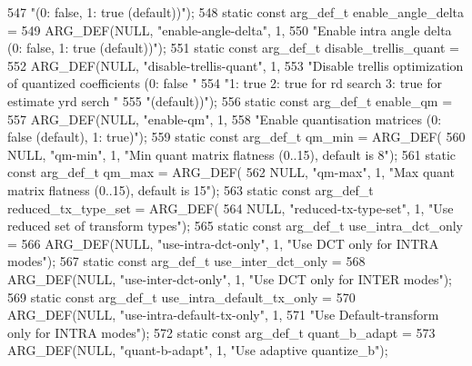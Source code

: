 \begin{DoxyCodeInclude}
{{{{{{{547             \textcolor{stringliteral}{"(0: false, 1: true (default))"});
548 \textcolor{keyword}{static} \textcolor{keyword}{const} arg\_def\_t enable\_angle\_delta =
549     ARG\_DEF(NULL, \textcolor{stringliteral}{"enable-angle-delta"}, 1,
550             \textcolor{stringliteral}{"Enable intra angle delta (0: false, 1: true (default))"});
551 \textcolor{keyword}{static} \textcolor{keyword}{const} arg\_def\_t disable\_trellis\_quant =
552     ARG\_DEF(NULL, \textcolor{stringliteral}{"disable-trellis-quant"}, 1,
553             \textcolor{stringliteral}{"Disable trellis optimization of quantized coefficients (0: false "}
554             \textcolor{stringliteral}{"1: true  2: true for rd search 3: true for estimate yrd serch "}
555             \textcolor{stringliteral}{"(default))"});
556 \textcolor{keyword}{static} \textcolor{keyword}{const} arg\_def\_t enable\_qm =
557     ARG\_DEF(NULL, \textcolor{stringliteral}{"enable-qm"}, 1,
558             \textcolor{stringliteral}{"Enable quantisation matrices (0: false (default), 1: true)"});
559 \textcolor{keyword}{static} \textcolor{keyword}{const} arg\_def\_t qm\_min = ARG\_DEF(
560     NULL, \textcolor{stringliteral}{"qm-min"}, 1, \textcolor{stringliteral}{"Min quant matrix flatness (0..15), default is 8"});
561 \textcolor{keyword}{static} \textcolor{keyword}{const} arg\_def\_t qm\_max = ARG\_DEF(
562     NULL, \textcolor{stringliteral}{"qm-max"}, 1, \textcolor{stringliteral}{"Max quant matrix flatness (0..15), default is 15"});
563 \textcolor{keyword}{static} \textcolor{keyword}{const} arg\_def\_t reduced\_tx\_type\_set = ARG\_DEF(
564     NULL, \textcolor{stringliteral}{"reduced-tx-type-set"}, 1, \textcolor{stringliteral}{"Use reduced set of transform types"});
565 \textcolor{keyword}{static} \textcolor{keyword}{const} arg\_def\_t use\_intra\_dct\_only =
566     ARG\_DEF(NULL, \textcolor{stringliteral}{"use-intra-dct-only"}, 1, \textcolor{stringliteral}{"Use DCT only for INTRA modes"});
567 \textcolor{keyword}{static} \textcolor{keyword}{const} arg\_def\_t use\_inter\_dct\_only =
568     ARG\_DEF(NULL, \textcolor{stringliteral}{"use-inter-dct-only"}, 1, \textcolor{stringliteral}{"Use DCT only for INTER modes"});
569 \textcolor{keyword}{static} \textcolor{keyword}{const} arg\_def\_t use\_intra\_default\_tx\_only =
570     ARG\_DEF(NULL, \textcolor{stringliteral}{"use-intra-default-tx-only"}, 1,
571             \textcolor{stringliteral}{"Use Default-transform only for INTRA modes"});
572 \textcolor{keyword}{static} \textcolor{keyword}{const} arg\_def\_t quant\_b\_adapt =
573     ARG\_DEF(NULL, \textcolor{stringliteral}{"quant-b-adapt"}, 1, \textcolor{stringliteral}{"Use adaptive quantize\_b"});
}}}}}}}
\end{DoxyCodeInclude}
